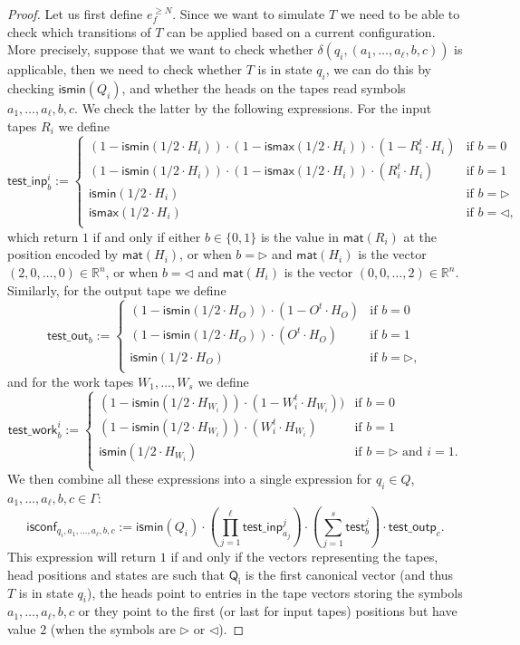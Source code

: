 \begin{proof}
Let us first define $e_f^{\geq N}$. Since we want to simulate $T$ we need to be able to check which 
transitions of $T$ can be applied based on a current configuration. More precisely,
suppose that we want to check whether $\delta(q_i,(a_1,\ldots,a_{\ell},b,c))$ is applicable, then we 
need to check whether $T$ is in state $q_i$, we can do this by checking 
$\mathsf{ismin}(Q_i)$, and whether the heads on the tapes read symbols $a_1,\ldots,a_{\ell},b,c$. We 
check the latter by the following expressions.
For the input tapes $R_i$ we define
$$
\mathsf{test\_inp}^i_b:=\begin{cases}
(1-\mathsf{ismin}(1/2\cdot H_i))\cdot(1-\mathsf{ismax}(1/2\cdot H_i))\cdot(1- R_i^t\cdot H_i) & \text{if $b=0$}\\
(1-\mathsf{ismin}(1/2\cdot H_i))\cdot(1-\mathsf{ismax}(1/2\cdot H_i))\cdot(R_i^t\cdot H_i) & \text{if $b=1$}\\
\mathsf{ismin}(1/2\cdot H_i) & \text{if $b=\rhd$}\\
\mathsf{ismax}(1/2\cdot H_i) & \text{if $b=\lhd$},\\
\end{cases}
$$
which return $1$ if and only if either $b\in\{0,1\}$ is the value in $\mathsf{mat}(R_i)$ at the 
position encoded by $\mathsf{mat}(H_i)$, or when $b=\rhd$ and $\mathsf{mat}(H_i)$ is the vector 
$(2,0,\ldots,0)\in\mathbb{R}^n$, or when $b=\lhd$ and $\mathsf{mat}(H_i)$ is the vector 
$(0,0,\ldots,2)\in\mathbb{R}^n$. Similarly, for the output tape we define
$$
\mathsf{test\_out}_b:=\begin{cases}
(1-\mathsf{ismin}(1/2\cdot H_O))\cdot(1- O^t\cdot H_O) & \text{if $b=0$}\\
(1-\mathsf{ismin}(1/2\cdot H_O))\cdot(O^t\cdot H_O) & \text{if $b=1$}\\
\mathsf{ismin}(1/2\cdot H_O) & \text{if $b=\rhd$},\\
\end{cases}
$$
and for the work tapes $W_1,\ldots,W_s$ we define
$$
\mathsf{test\_work}^i_b:=\begin{cases}
(1-\mathsf{ismin}(1/2\cdot H_{W_i}))\cdot(1- W_i^t\cdot H_{W_i})) & \text{if $b=0$}\\
(1-\mathsf{ismin}(1/2\cdot H_{W_i}))\cdot (W_i^t\cdot H_{W_i}) & \text{if $b=1$}\\
\mathsf{ismin}(1/2\cdot H_{W_i}) & \text{if $b=\rhd$ and $i=1$}.\\
\end{cases}
$$
We then combine all these expressions into a single expression for $q_i\in Q$, 
$a_1,\ldots,a_\ell,b,c\in\Gamma$:
$$
\mathsf{isconf}_{q_i,a_1,\ldots,a_\ell,b,c}:=
\mathsf{ismin}(Q_i)\cdot \left(\prod_{j=1}^{\ell} \mathsf{test\_inp}_{a_j}^j\right)
\cdot\left(\sum_{j=1}^s \mathsf{test}_b^j\right)\cdot \mathsf{test\_outp}_{c}.
$$
This expression will return $1$ if and only if the vectors representing the tapes, 
head positions and states are such that $\mathsf{Q_i}$ is the first canonical vector 
(and thus $T$ is in state $q_i$), the heads point to entries in the tape vectors storing 
the symbols $a_1,\ldots,a_{\ell}, b,c$ or they point to the first (or last for input tapes) 
positions but have value $2$ (when the symbols are $\rhd$ or $\lhd$). 


\end{proof}
